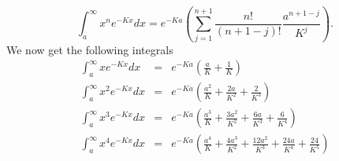 \documentclass{article}
\numberwithin{equation}{section}
\begin{document}
\begin{enumerate}
\begin{equation}
\int_a^\infty x^n e^{-Kx}dx = 
e^{-Ka}
\left(\sum_{j=1}^{n+1}\frac{n!}{(n+1-j)!}\frac{a^{n+1-j}}{K^j}\right).
\end{equation}
We now get the following integrals
\begin{eqnarray}
\int_a^\infty xe^{-Kx}dx &=& e^{-Ka}\left(\frac{a}{K} + \frac{1}{K}\right)
    \label{a1e8} \\
\int_a^\infty x^2e^{-Kx}dx &=& e^{-Ka}\left(\frac{a^2}{K} + \frac{2a}{K^2}
	+ \frac{2}{K^3}\right) \label{a1e9} \\
\int_a^\infty x^3e^{-Kx}dx &=& e^{-Ka}\left(\frac{a^3}{K} + \frac{3a^2}{K^2}
	+ \frac{6a}{K^3} + \frac{6}{K^4}\right) \label{a1e10} \\
\int_a^\infty x^4e^{-Kx}dx &=& e^{-Ka}\left(\frac{a^4}{K} + \frac{4a^3}{K^2}
	+ \frac{12a^2}{K^3} + \frac{24a}{K^4}
	+ \frac{24}{K^5} \right) \label{a1e11}
\end{eqnarray}
\end{enumerate}
\end{document}

